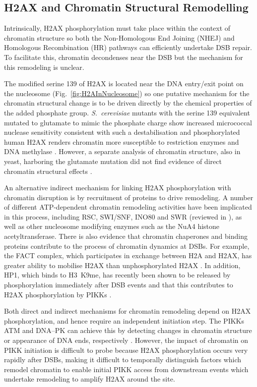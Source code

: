 \documentclass[graybox]{svmult}
\begin{document}
\subsection{\ugamma H2AX and Chromatin Structural Remodelling}
\label{subsec:chromatin-remodelling}
Intrinsically, H2AX phosphorylation must take place within the context of chromatin structure so
both the Non-Homologous End Joining (NHEJ) and Homologous Recombination (HR) pathways can efficiently
undertake DSB repair. To facilitate this, chromatin decondenses near the DSB \cite{MJK+06} but the
mechanism for this remodeling is unclear.

The modified serine 139 of H2AX is located near the DNA entry/exit point on the nucleosome
(Fig.~\ref{fig:H2AInNucleosome}) so one putative mechanism for the chromatin structural change is to
be driven directly by the chemical properties of the added phosphate group. \emph{S.\ cerevisiae}
mutants with the serine 139 equivalent mutated to glutamate to mimic the phosphate charge show
increased micrococcal nuclease sensitivity consistent with such a destabilisation \cite{JAD00} and
phosphorylated human H2AX renders chromatin more susceptible to restriction enzymes and DNA
methylase \cite{KHHK+08}. However, a separate analysis of chromatin structure, also in yeast,
harboring the glutamate mutation did not find evidence of direct chromatin structural effects \cite{FIT07}.

An alternative indirect mechanism for linking H2AX phosphorylation with chromatin disruption is by
recruitment of proteins to drive remodeling. A number of different ATP-dependent chromatin remodeling
activities have been implicated in this process, including RSC, SWI/SNF, INO80 and SWR (reviewed
in ), as well as other nucleosome modifying enzymes such as the NuA4 histone
acetyltransferase. There is also evidence that chromatin chaperones and binding proteins contribute
to the process of chromatin dynamics at DSBs. For example, the FACT complex, which participates in
exchange between H2A and H2AX, has greater ability to mobilise \ugamma H2AX than unphosphorylated
H2AX \cite{KHHK+08}. In addition, HP1\ubeta, which binds to H3~K9me, has recently been shown to be
released by phosphorylation immediately after DSB events and that this contributes to H2AX
phosphorylation by PIKKs \cite{AJB+08}.

Both direct and indirect mechanisms for chromatin remodeling depend on H2AX phosphorylation, and
hence require an independent initiation step. The PIKKs ATM and DNA--PK can achieve this by
detecting changes in chromatin structure or appearance of DNA ends, respectively \cite{CJB03,BC04}.
However, the impact of chromatin on PIKK initiation is difficult to probe because H2AX phosphorylation
occurs very rapidly after DSBs, making it difficult to temporally distinguish factors which remodel
chromatin to enable initial PIKK access from downstream events which undertake remodeling to
amplify \ugamma H2AX around the site.
\end{document}
